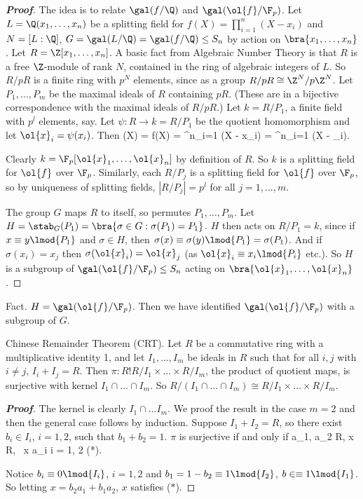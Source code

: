 \begin{proof}[\bf Proof]
The idea is to relate $\gal(f/\Q)$ and $\gal( \ol{f}/\F_p)$. Let $L = \Q(x_1, \dots , x_n)$ be a splitting field for $f(X) = \prod^n_{i=1}(X -x_i)$ and $N = [L : \Q]$, $G = \gal(L/\Q) = \gal(f/\Q) \leq S_n$ by action on $\bra{x_1, \dots , x_n}$. Let $R = \Z[x_1, \dots , x_n]$. A basic fact from Algebraic
Number Theory is that $R$ is a free $\Z$-module of rank $N$, contained in the ring of algebraic integers of $L$. So $R/pR$ is a finite ring with $p^N$ elements, since as a group $R/pR \cong \Z^N/p\Z^N$. Let $P_1, \dots , P_m$ be the maximal ideals of $R$ containing $pR$. (These are in a bijective correspondence with the maximal ideals of $R/pR$.) Let $k = R/P_1$, a finite field with $p^l$ elements, say. Let $\psi: R \to k = R/P_1$ be the quotient homomorphism and let $\ol{x}_i = \psi(x_i)$. Then 
\be
{}(X) = f(X) = \prod^n_{i=1} \psi(X - x_i) = \prod^n_{i=1} (X - _i).
\ee

Clearly $k = \F_p[\ol{x}_1, \dots , \ol{x}_n]$ by definition of $R$. So $k$ is a splitting field for $\ol{f}$ over $\F_p$. Similarly, each $R/P_j$ is a splitting field for $\ol{f}$ over $\F_p$, so by uniqueness of splitting fields, $|R/P_j | = p^l$ for all $j = 1, \dots ,m$.

The group $G$ maps $R$ to itself, so permutes $P_1, \dots , P_m$. Let $H = \stab_G(P_1) = \bra{\sigma \in G : \sigma(P_1) = P_1}$. $H$ then acts on $R/P_1 = k$, since if $x \equiv y \lmod{P_1}$ and $\sigma \in H$, then $\sigma(x) \equiv \sigma(y) \lmod{P_1} = \sigma(P_1)$. And if $\sigma(x_i) = x_j$ then $\sigma(\ol{x}_i) = \ol{x}_j$ (as $\ol{x}_i \equiv x_i \lmod{P_i}$ etc.). So $H$ is a subgroup of $\gal(\ol{f}/\F_p) \leq S_n$ acting on $\bra{\ol{x}_1, \dots , \ol{x}_n}$.
\end{proof}

Fact. $H = \gal( \ol{f}/\F_p)$. Then we have identified $\gal(\ol{f}/\F_p)$ with a subgroup of $G$.

Chinese Remainder Theorem (CRT). Let $R$ be a commutative ring with a multiplicative identity 1, and let $I_1, \dots , I_m$ be ideals in $R$ such that for all $i, j$ with $i \neq  j$, $I_i+I_j = R$. Then $\pi: R ! R/I_1\times \dots \times R/I_m$, the product of quotient maps, is surjective with kernel $I_1 \cap \dots\cap I_m$. So $R/(I_1 \cap \dots\cap I_m) \cong R/I_1 \times \dots\times R/I_m$.

\begin{proof}[\bf Proof]
The kernel is clearly $I_1 \cap \dots I_m$. We proof the result in the case $m = 2$ and then the general case follows by induction. Suppose $I_1 + I_2 = R$, so there exist $b_i \in I_i$, $i = 1, 2$, such that $b_1 + b_2 = 1$. $\pi$ is surjective if and only if 
\be
\forall a_1, a_2 \in R, \quad \exists x \in R, \  x \equiv a_i  i = 1, 2 (*).
\ee

Notice $b_i \equiv 0 \lmod{I_i}$, $i = 1, 2$ and $b_1 = 1 - b_2 \equiv 1 \lmod{I_2}$, $b\in  \equiv 1 \lmod{I_1}$. So letting $x = b_2a_1 + b_1a_2$, $x$ satisfies ($*$).
\end{proof}

